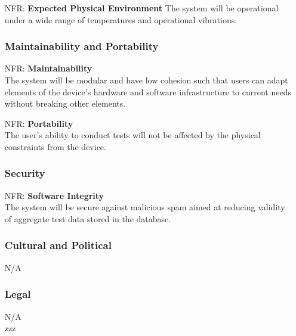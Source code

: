 \documentclass[12pt]{article}
\newcounter{nfrnum} %
\begin{document}
\begin{itemize}
    \item[NFR\refstepcounter{nfrnum}\thenfrnum:]
    \textbf{Expected Physical Environment}
    The system will be operational under a wide range of temperatures and operational vibrations.\\

\subsubsection{Maintainability and Portability}

    \item[NFR\refstepcounter{nfrnum}\thenfrnum:]
      \textbf{Maintainability}\\
    The system will be modular and have low cohesion such that users can adapt elements of the device's hardware and software infrastructure to current needs without breaking other elements.\\

    \item[NFR\refstepcounter{nfrnum}\thenfrnum:]
    \textbf{Portability}\\
    The user's ability to conduct tests will not be affected by the physical constraints from the device.\\
  
\subsubsection{Security}

    \item[NFR\refstepcounter{nfrnum}\thenfrnum:]
    \textbf{Software Integrity}\\
    The system will be secure against malicious spam aimed at reducing validity of aggregate test data stored in the database.\\

\subsubsection{Cultural and Political}

    N/A\\

\subsubsection{Legal}

    N/A\\zzz

\end{itemize}
\end{document}
